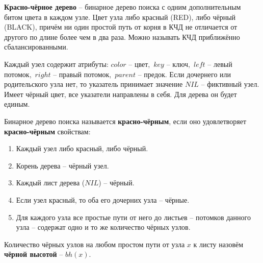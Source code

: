 \documentclass[a4paper,12pt]{article}
\begin{document}
\begin{definition}
    \textbf{Красно-чёрное дерево} -- бинарное дерево поиска с одним дополнительным битом цвета в каждом узле. Цвет узла либо красный (RED), либо чёрный (BLACK), причём ни один простой путь от корня в КЧД не отличается от другого по длине более чем в два раза. Можно называть КЧД приближённо сбалансированными.
    
    Каждый узел содержит атрибуты: $color$ -- цвет,\ $key$ -- ключ,\ $left$ -- левый потомок,\ $right$ -- правый потомок,\ $parent$ -- предок. Если дочернего или родительского узла нет, то указатель принимает значение $NIL$ -- фиктивный узел. Имеет чёрный цвет, все указатели направлены в себя. Для дерева он будет единым.

    Бинарное дерево поиска называется \textbf{красно-чёрным}, если оно удовлетворяет \textbf{красно-чёрным} свойствам:
    \begin{enumerate}
        \item Каждый узел либо красный, либо чёрный.
        \item Корень дерева -- чёрный узел.
        \item Каждый лист дерева ($NIL$) -- чёрный.
        \item Если узел красный, то оба его дочерних узла -- чёрные.
        \item Для каждого узла все простые пути от него до листьев -- потомков данного узла -- содержат одно и то же количество чёрных узлов.
    \end{enumerate}
    
    Количество чёрных узлов на любом простом пути от узла $x$ к листу назовём \textbf{чёрной высотой} -- $bh(x)$.
\end{definition}
\end{document}

